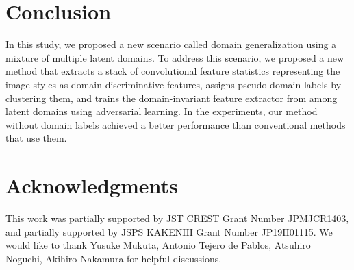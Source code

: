 \documentclass[letterpaper]{article} \usepackage{aaai20}  \usepackage{times}  \usepackage{helvet} \usepackage{courier}  \usepackage[hyphens]{url}  \usepackage{graphicx} \urlstyle{rm} \def\UrlFont{\rm}  \usepackage{graphicx}  \usepackage[whole]{bxcjkjatype}
\begin{document}
\section{Conclusion}
In this study, we proposed a new scenario called domain generalization using a mixture of multiple latent domains. To address this scenario, we proposed a new method that extracts a stack of convolutional feature statistics representing the image styles as domain-discriminative features, assigns pseudo domain labels by clustering them, and trains the domain-invariant feature extractor from among latent domains using adversarial learning. In the experiments, our method without domain labels achieved a better performance than conventional methods that use them.

\section{Acknowledgments}
This work was partially supported by JST CREST Grant Number JPMJCR1403, and partially supported by JSPS KAKENHI Grant Number JP19H01115. We would like to thank Yusuke Mukuta, Antonio Tejero de Pablos, Atsuhiro Noguchi, Akihiro Nakamura for helpful discussions.



\end{document}
